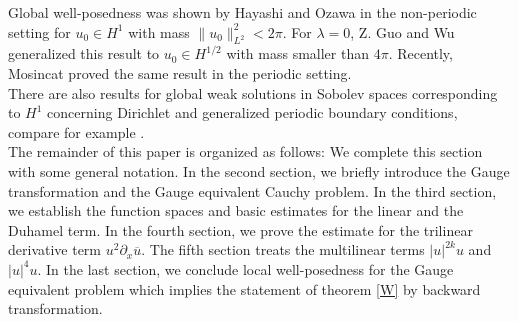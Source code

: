 \documentclass[reqno]{amsart}
\theoremstyle{Definitionl}
\theoremstyle{Definitionk}
\theoremstyle{definition}
\theoremstyle{Satzk}
\theoremstyle{Satzl}
\theoremstyle{Bemerkung}
\begin{document}
Global well-posedness was shown by Hayashi and Ozawa \cite{HaOz2,Hay,HaOz} in the non-periodic setting for $u_0\in H^1$ with mass $\|u_0\|_{L^2}^2<2\pi$. For $\lambda=0$, Z. Guo and Wu \cite{Wu,GuWu} generalized this result to $u_0\in H^{1/2}$ with mass smaller than $4\pi$. Recently, Mosincat \cite{Mos} proved the same result in the periodic setting.\\[10pt]
There are also results for global weak solutions in Sobolev spaces corresponding to $H^1$ concerning Dirichlet and generalized periodic boundary conditions, compare for example \cite{Chen, Mesk}.\\[10pt]
The remainder of this paper is organized as follows: We complete this section with some general notation. In the second section, we briefly introduce the Gauge transformation and the Gauge equivalent Cauchy problem. In the third section, we establish the function spaces and basic estimates for the linear and the Duhamel term. In the fourth section, we prove the estimate for the trilinear derivative term $u^2\partial_x\overline u$. The fifth section treats the multilinear terms $|u|^{2k}u$ and $|u|^4u$. In the last section, we conclude local well-posedness for the Gauge equivalent problem which implies the statement of theorem \ref{W} by backward transformation.
\end{document}
